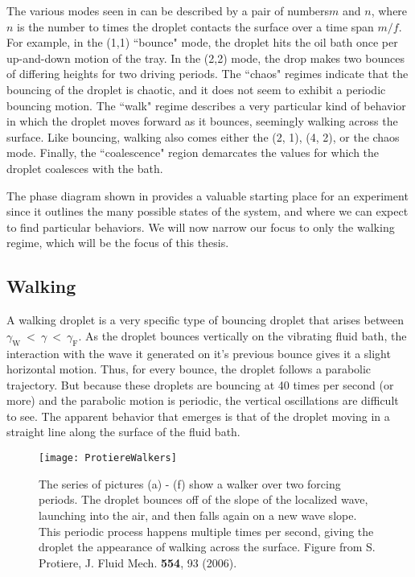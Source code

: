 The various modes seen in  can be described by a pair of numbers$m$ and $n$, where $n$ is the number to times the droplet contacts the surface over a time span $m/f$. For example, in the (1,1) ``bounce" mode, the droplet hits the oil bath once per up-and-down motion of the tray. In the (2,2) mode, the drop makes two bounces of differing heights for two driving periods. The ``chaos" regimes indicate that the bouncing of the droplet is chaotic, and it does not seem to exhibit a periodic bouncing motion. The ``walk" regime describes a very particular kind of behavior in which the droplet moves forward as it bounces, seemingly walking across the surface. Like bouncing, walking also comes either the (2, 1), (4, 2), or the chaos mode. Finally, the ``coalescence" region demarcates the values for which the droplet coalesces with the bath.

The phase diagram shown in  provides a valuable starting place for an experiment since it outlines the many possible states of the system, and where we can expect to find particular behaviors. We will now narrow our focus to only the walking regime, which will be the focus of this thesis.

	        \subsection{Walking}
	        \label{sect:walking}
A walking droplet is a very specific type of bouncing droplet that arises between $\gamma_\mathrm{W}~<~\gamma~<~\gamma_\mathrm{F}$. As the droplet bounces vertically on the vibrating fluid bath, the interaction with the wave it generated on it's previous bounce gives it a slight horizontal motion. Thus, for every bounce, the droplet follows a parabolic trajectory. But because these droplets are bouncing at 40 times per second (or more) and the parabolic motion is periodic, the vertical oscillations are difficult to see. The apparent behavior that emerges is that of the droplet moving in a straight line along the surface of the fluid bath.             

 \begin{figure}[h]
	       \centering
	    \texttt{[image: ProtiereWalkers]}
	     \caption{%
	    The series of pictures (a) - (f) show a walker over two forcing periods. The droplet bounces off of the slope of the localized wave, launching into the air, and then falls again on a new wave slope. This periodic process happens multiple times per second, giving the droplet the appearance of walking across the surface. Figure from S. Protiere, J. Fluid Mech. \textbf{554}, 93 (2006).
	     }
	 \label{Couderwalkers}
	\end{figure}
 
